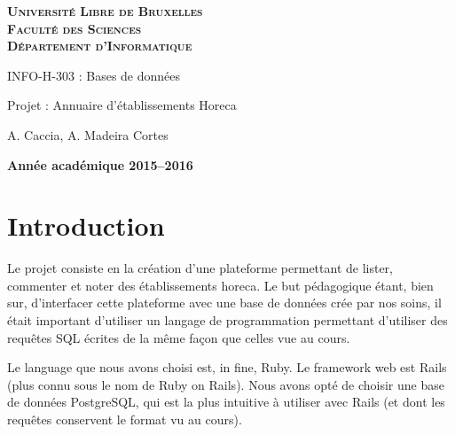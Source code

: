 \documentclass[a4paper,10pt]{article}
\begin{document}
\begin{titlepage}
    \begin{center}
        \textbf{\textsc{Université Libre de Bruxelles}}\\
        \textbf{\textsc{Faculté des Sciences}}\\
        \textbf{\textsc{Département d'Informatique}}

        \vfill{}
        \vfill{}

        \begin{center}
            {\Huge INFO-H-303 : Bases de données}
        \end{center}

        {\Huge \par}

        \begin{center}
            {\LARGE Projet : Annuaire d'établissements Horeca}
        \end{center}

        {\Huge \par}

        \begin{center}
            {\large A. Caccia, A. Madeira Cortes}
        \end{center}

        {\Huge \par}
        \vfill{}
        \vfill{}

        {\large\par}
        \vfill{}
        \vfill{}

        \textbf{Année académique 2015--2016}
    \end{center}
\end{titlepage}

\section{Introduction}

Le projet consiste en la création d'une plateforme permettant de lister, commenter et noter des établissements horeca. Le but pédagogique étant, bien sur, d'interfacer cette plateforme avec une base de données crée par nos soins, il était important d'utiliser un langage de programmation permettant d'utiliser des requêtes SQL écrites de la même façon que celles vue au cours.

Le language que nous avons choisi est, in fine, Ruby. Le framework web est Rails (plus connu sous le nom de Ruby on Rails). Nous avons opté de choisir une base de données PostgreSQL, qui est la plus intuitive à utiliser avec Rails (et dont les requêtes conservent le format vu au cours).
\end{document}
